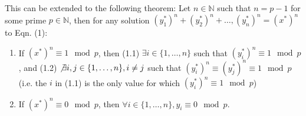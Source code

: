 \documentclass{article}
\begin{document}
\begin{flushleft}
\vspace{.1in}

This can be extended to the following theorem: Let $n \in \mathbb{N}$ such that $n = p - 1$ for some prime $p \in \mathbb{N}$, then for any solution $(y_1^*)^n + (y_2^*)^n + \ldots, (y_n^*)^n = (x^*)^n$ to Eqn. (1): 
    \begin{enumerate}
        \item If $(x^*)^n \equiv 1 \mod p$, then (1.1) $\exists i \in \{1, \ldots, n\}$ such that $(y^*_i)^n \equiv 1 \mod p$, and (1.2) $\not\exists i, j \in \{1, \ldots, n\}, i \neq j$ such that $(y^*_i)^n \equiv (y^*_j)^n \equiv 1 \mod p$ (i.e. the $i$ in (1.1) is the only value for which $(y^*_i)^n \equiv 1 \mod p$)
        \item If $(x^*)^n \equiv 0 \mod p$, then $\forall i \in \{1, \ldots, n\}, y_i \equiv 0 \mod p$.
    \end{enumerate}


\end{flushleft}
\end{document}
